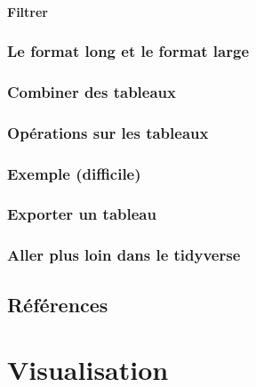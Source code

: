 \documentclass[]{book}
\begin{document}
\hypertarget{filtrer}{%
\subsubsection{Filtrer}\label{filtrer}}

\hypertarget{le-format-long-et-le-format-large}{%
\subsection{Le format long et le format
large}\label{le-format-long-et-le-format-large}}

\hypertarget{combiner-des-tableaux}{%
\subsection{Combiner des tableaux}\label{combiner-des-tableaux}}

\hypertarget{opuxe9rations-sur-les-tableaux}{%
\subsection{Opérations sur les
tableaux}\label{opuxe9rations-sur-les-tableaux}}

\hypertarget{exemple-difficile}{%
\subsection{Exemple (difficile)}\label{exemple-difficile}}

\hypertarget{exporter-un-tableau}{%
\subsection{Exporter un tableau}\label{exporter-un-tableau}}

\hypertarget{aller-plus-loin-dans-le-tidyverse}{%
\subsection{Aller plus loin dans le
tidyverse}\label{aller-plus-loin-dans-le-tidyverse}}

\hypertarget{ruxe9fuxe9rences}{%
\section{Références}\label{ruxe9fuxe9rences}}

\hypertarget{chapitre-visualisation}{%
\chapter{Visualisation}\label{chapitre-visualisation}}
\end{document}
